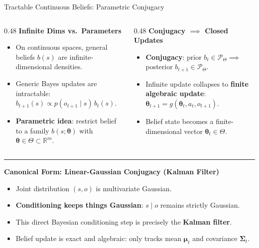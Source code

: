 \documentclass[18pt,aspectratio=149]{beamer}
\begin{document}
\begin{frame}{Tractable Continuous Beliefs: Parametric Conjugacy}
    \small
    \begin{columns}[T,onlytextwidth]
        \begin{column}{0.48\textwidth}
            \textbf{Infinite Dims vs.\ Parameters}
            \begin{itemize}
                \item On continuous spaces, general beliefs $b(s)$ are infinite-dimensional densities.
                \item Generic Bayes updates are intractable:
                $b_{t+1}(s) \propto p(o_{t+1} \mid s) \, b_t(s)$.
                \item \textbf{Parametric idea}: restrict belief to a family $b(s; \boldsymbol{\theta})$ with $\boldsymbol{\theta} \in \Theta \subset \mathbb{R}^m$.
            \end{itemize}
        \end{column}

        \begin{column}{0.48\textwidth}
            \textbf{Conjugacy $\implies$ Closed Updates}
            \begin{itemize}
                \item \textbf{Conjugacy}: prior $b_t \in \mathcal{P}_\Theta \implies$ posterior $b_{t+1} \in \mathcal{P}_\Theta$.
                \item Infinite update collapses to \textbf{finite algebraic update}:
                $\boldsymbol{\theta}_{t+1} = g(\boldsymbol{\theta}_t, a_t, o_{t+1})$.
                \item Belief state becomes a finite-dimensional vector $\boldsymbol{\theta}_t \in \Theta$.
            \end{itemize}
        \end{column}
    \end{columns}

    \vspace{0.2em}
    \hrule
    \vspace{0.15em}

    \textbf{Canonical Form: Linear-Gaussian Conjugacy (Kalman Filter)}
    \begin{itemize}
        \item Joint distribution $(s, o)$ is multivariate Gaussian.
        \item \textbf{Conditioning keeps things Gaussian}: $s \mid o$ remains strictly Gaussian.
        \item This direct Bayesian conditioning step is precisely the \textbf{Kalman filter}.
        \item Belief update is exact and algebraic: only tracks mean $\boldsymbol{\mu}_t$ and covariance $\boldsymbol{\Sigma}_t$.
    \end{itemize}
\end{frame}
\end{document}
